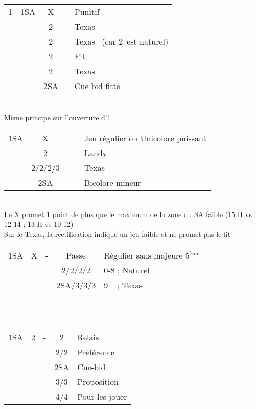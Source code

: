 \documentclass[a4paper, oneside, 11pt]{report}
\begin{document}
	\begin{tabular}{cccc|l}
	1\coeur & 1SA & X && Punitif\\
	&& 2\trefle && Texas \carreau\\
	&& 2\carreau && Texas \pique\ (car 2\coeur\ est naturel)\\
	&& 2\coeur && Fit\\
	&& 2\pique && Texas \trefle\\
	&& 2SA && Cue bid fitté\\
	\end{tabular}\\
	Même principe sur l'ouverture d'1\pique\\

	\begin{tabular}{cccc|l}
	1SA & X &&& Jeu régulier ou Unicolore puissant\\
	& 2\trefle &&& Landy\\
	& 2\carreau/2\coeur/2\pique/3\trefle &&& Texas\\
	& 2SA &&& Bicolore mineur\\
	\end{tabular}\\
	Le X promet 1 point de plus que le maximum de la zone du SA faible (15 H vs 12-14 ; 13 H vs 10-12)\\
	Sur le Texas, la rectification indique un jeu faible et ne promet pas le fit\\

	\begin{tabular}{cccc|l}
	1SA & X & - & Passe & Régulier sans majeure 5$^{ème}$\\
	&&& 2\trefle/2\carreau/2\coeur/2\pique & 0-8 ; Naturel\\
	&&& 2SA/3\trefle/3\carreau/3\coeur & 9+ ; Texas\\
	\end{tabular}\\\\

	\begin{tabular}{cccc|l}
	1SA & 2\trefle & - & 2\carreau & Relais\\
	&&& 2\coeur/2\pique & Préférence\\
	&&& 2SA & Cue-bid\\
	&&& 3\coeur/3\pique & Proposition\\
	&&& 4\coeur/4\pique & Pour les jouer\\
	\end{tabular}
\end{document}

